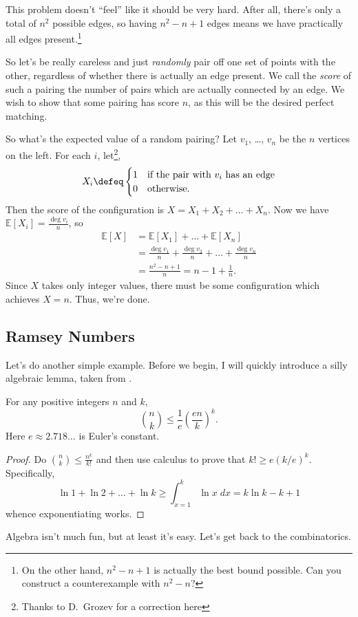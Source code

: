 \documentclass[11pt]{scrartcl}
\newcommand\EE{\mathbb E}
\begin{document}
This problem doesn't ``feel'' like it should be very hard.
After all, there's only a total of $n^2$ possible edges,
so having $n^2-n+1$ edges means we have practically all edges present.\footnote{On the other hand,
$n^2-n+1$ is actually the best bound possible. Can you construct a counterexample with $n^2-n$?}

So let's be really careless and just \emph{randomly} pair off one set of points with the other,
regardless of whether there is actually an edge present.
We call the \emph{score} of such a pairing the number of pairs which are actually connected by an edge.
We wish to show that some pairing has score $n$, as this will be the desired perfect matching.

So what's the expected value of a random pairing?
Let $v_1$, \dots, $v_n$ be the $n$ vertices on the left.
For each $i$, let\footnote{Thanks to D.\ Grozev for a correction here},
\[
  X_i \defeq
  \begin{cases}
    1 & \text{if the pair with $v_i$ has an edge} \\
    0 & \text{otherwise}.
  \end{cases}
\]
Then the score of the configuration is $X = X_1 + X_2 + \dots + X_n$.
Now we have $\EE[X_i] = \frac{\deg v_i}{n}$, so
\begin{align*}
  \EE[X] &= \EE[X_1] + \dots + \EE[X_n] \\
  &= \frac{\deg v_1}{n} + \frac{\deg v_2}{n} + \dots + \frac{\deg v_n}{n} \\
  &= \frac{n^2-n+1}{n} = n-1 + \frac 1n.
\end{align*}
Since $X$ takes only integer values,
there must be some configuration which achieves $X=n$.
Thus, we're done.

\subsection{Ramsey Numbers}
Let's do another simple example. Before we begin, I will quickly introduce a silly algebraic lemma,
taken from \cite[page 30]{holden}.
\begin{lemma}
  For any positive integers $n$ and $k$,
  \[ \binom nk \le \frac 1e \left( \frac{en}{k} \right)^k. \]
  Here $e \approx 2.718\dots$ is Euler's constant.
  \label{lem:binom_bound}
\end{lemma}
\begin{proof}
  Do $\binom nk \le \frac{n^k}{k!}$ and then use calculus to prove that
  $k! \ge e(k/e)^k$. Specifically,
  \[ \ln 1 + \ln 2 + \dots + \ln k \ge \int_{x=1}^k \ln x \; dx = k \ln k - k + 1 \]
  whence exponentiating works.
\end{proof}
Algebra isn't much fun, but at least it's easy. Let's get back to the combinatorics.
\end{document}
